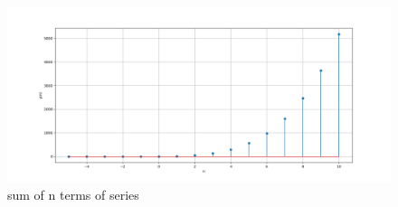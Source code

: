 \documentclass[journal,12pt,twocolumn]{IEEEtran}
\theoremstyle{remark}
\begin{document}
    \begin{figure}[!h] 
    \centering
    \includegraphics[width=\columnwidth]{figs/sumplot.png}
    \caption{sum of n terms of series}
    \label{fig:Graph1_math.11.9.4.8}
    \end{figure}
\end{document}
